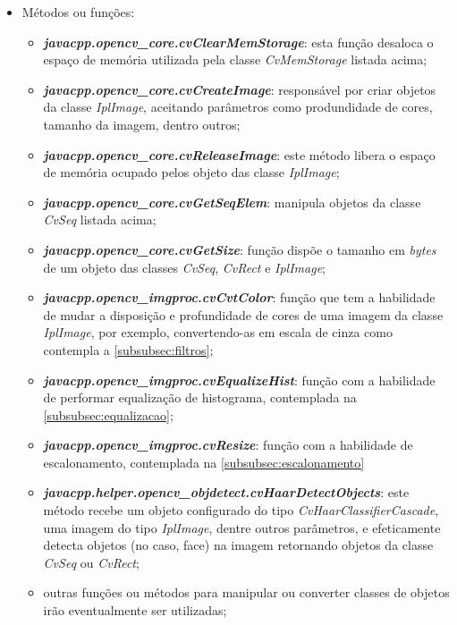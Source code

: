 \begin{itemize}
	\item Métodos ou funções:
	\begin{itemize}		
		\item \textbf{\textit{javacpp.opencv\_core.cvClearMemStorage}}: esta função desaloca o espaço de memória utilizada pela classe \textit{CvMemStorage} listada acima;
		
		\item \textbf{\textit{javacpp.opencv\_core.cvCreateImage}}: responsável por criar objetos da classe \textit{IplImage}, aceitando parâmetros como produndidade de cores, tamanho da imagem, dentro outros;
		
		\item \textbf{\textit{javacpp.opencv\_core.cvReleaseImage}}: este método libera o espaço de memória ocupado pelos objeto das classe \textit{IplImage};

		\item \textbf{\textit{javacpp.opencv\_core.cvGetSeqElem}}: manipula objetos da classe \textit{CvSeq} listada acima;
		
		\item \textbf{\textit{javacpp.opencv\_core.cvGetSize}}: função dispõe o tamanho em \textit{bytes} de um objeto das classes \textit{CvSeq}, \textit{CvRect} e \textit{IplImage};		
		
		\item \textbf{\textit{javacpp.opencv\_imgproc.cvCvtColor}}: função que tem a habilidade de mudar a disposição e profundidade de cores de uma imagem da classe \textit{IplImage}, por exemplo, convertendo-as em escala de cinza como contempla a \autoref{subsubsec:filtros};
		
		\item \textbf{\textit{javacpp.opencv\_imgproc.cvEqualizeHist}}: função com a habilidade de performar equalização de histograma, contemplada na \autoref{subsubsec:equalizacao};
		
		\item \textbf{\textit{javacpp.opencv\_imgproc.cvResize}}: função com a habilidade de escalonamento, contemplada na \autoref{subsubsec:escalonamento}

		\item \textbf{\textit{javacpp.helper.opencv\_objdetect.cvHaarDetectObjects}}: este método recebe um objeto configurado do tipo \textit{CvHaarClassifierCascade}, uma imagem do tipo \textit{IplImage}, dentre outros parâmetros, e efeticamente detecta objetos (no caso, face) na imagem retornando objetos da classe \textit{CvSeq} ou \textit{CvRect};
		
		\item outras funções ou métodos para manipular ou converter classes de objetos irão eventualmente ser utilizadas;
	\end{itemize}	
\end{itemize}

